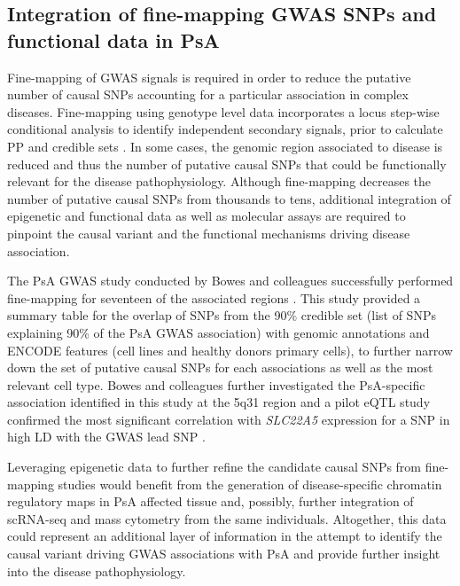 


\subsection{Integration of fine-mapping GWAS SNPs and functional data in PsA}

Fine-mapping of GWAS signals is required in order to reduce the putative number of causal SNPs accounting for a particular association in complex diseases. Fine-mapping using genotype level data incorporates a locus step-wise conditional analysis to identify independent secondary signals, prior to calculate PP and credible sets \parencite{Maller2012,Bunt2015}. In some cases, the genomic region associated to disease is reduced and thus the number of putative causal SNPs that could be functionally relevant for the disease pathophysiology. Although fine-mapping decreases the number of putative causal SNPs from thousands to tens, additional integration of epigenetic and functional data as well as molecular assays are required to pinpoint the causal variant and the functional mechanisms driving disease association.  

The PsA GWAS study conducted by Bowes and colleagues successfully performed fine-mapping for seventeen of the associated regions \parencite{Bowes2015}. This study provided a summary table for the overlap of SNPs from the 90\% credible set (list of SNPs explaining 90\% of the PsA GWAS association) with genomic annotations and ENCODE features (cell lines and healthy donors primary cells), to further narrow down the set of putative causal SNPs for each associations as well as the most relevant cell type. Bowes and colleagues further investigated the PsA-specific association identified in this study at the 5q31 region and a pilot eQTL study confirmed the most significant correlation with \textit{SLC22A5} expression for a SNP in high LD with the GWAS lead SNP \parencite{Bowes2015}.


Leveraging epigenetic data to further refine the candidate causal SNPs from fine-mapping studies would benefit from the generation of disease-specific chromatin regulatory maps in PsA affected tissue and, possibly, further integration of scRNA-seq and mass cytometry from the same individuals. Altogether, this data could represent an additional layer of information in the attempt to identify the causal variant driving GWAS associations with PsA and provide further insight into the disease pathophysiology. 

